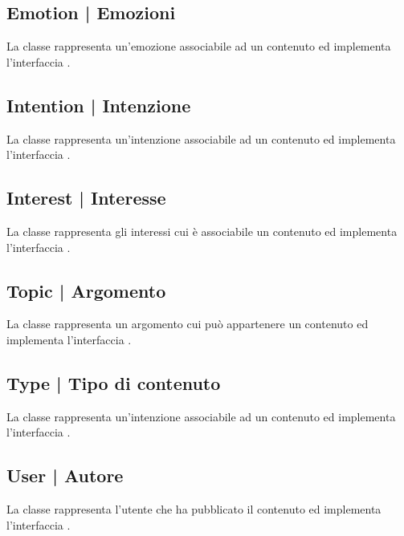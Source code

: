 \documentclass[10pt,a4paper,headinclude,footinclude,hidelinks]{scrreprt} %
\begin{document}
	\subsection[Emotion]{Emotion | Emozioni}
	\label{sec:stage:design:model:metadata-emotion}
	La classe \textit{} rappresenta un'emozione associabile ad un contenuto ed implementa l'interfaccia \textit{}.

	\subsection[Intention]{Intention | Intenzione}
	\label{sec:stage:design:model:metadata-intention}
	La classe \textit{} rappresenta un'intenzione associabile ad un contenuto ed implementa l'interfaccia \textit{}.

	\subsection[Interest]{Interest | Interesse}
	\label{sec:stage:design:model:metadata-interest}
	La classe \textit{} rappresenta gli interessi cui è associabile un contenuto ed implementa l'interfaccia \textit{}.

	\subsection[Topic]{Topic | Argomento}
	\label{sec:stage:design:model:metadata-topic}
	La classe \textit{} rappresenta un argomento cui può appartenere un contenuto ed implementa l'interfaccia \textit{}.

	\subsection[Type]{Type | Tipo di contenuto}
	\label{sec:stage:design:model:metadata-type}
	La classe \textit{} rappresenta un'intenzione associabile ad un contenuto ed implementa l'interfaccia \textit{}.

	\subsection[User]{User | Autore}
	\label{sec:stage:design:model:metadata-user}
	La classe \textit{} rappresenta l'utente che ha pubblicato il contenuto ed implementa l'interfaccia \textit{}.
\end{document}
